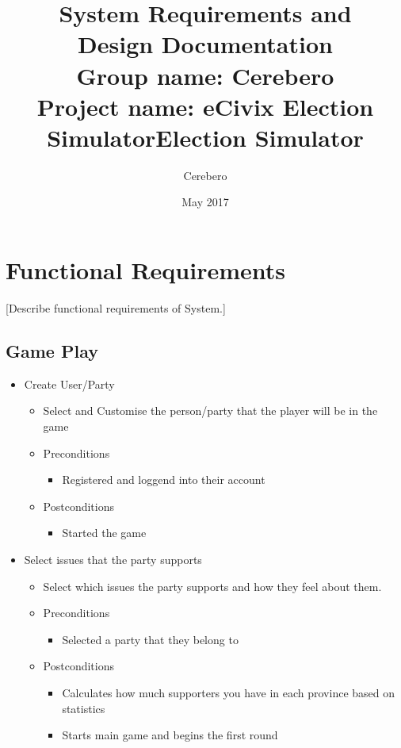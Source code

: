\documentclass{article}
\title{\textbf{System Requirements and \\Design Documentation}\\
        \textbf{Group name:} Cerebero\\
       \textbf{ Project name:} eCivix Election Simulator}
\date{May 2017}
\author{Cerebero}
\title{Election Simulator}
\begin{document}
  
  \tableofcontents
  \newpage

  \section{Functional Requirements}
  [Describe functional requirements of System.]
   \subsection{Game Play}
   	\begin{itemize}
   		\item Create User/Party
			\begin{itemize}
				\item Select and Customise the person/party that the player will be in the game
				\item Preconditions
				\begin{itemize}
					\item Registered and loggend into their account
				\end{itemize}
				\item Postconditions
				\begin{itemize}
					\item Started the game
				\end{itemize}
			\end{itemize}
	\end{itemize}
	
	\begin{itemize}
   		\item Select issues that the party supports
			\begin{itemize}
				\item Select which issues the party supports and how they feel about them.
				\item Preconditions
				\begin{itemize}
					\item Selected a party that they belong to
				\end{itemize}
				\item Postconditions
				\begin{itemize}
					\item Calculates how much supporters you have in each province based on statistics
					\item Starts main game and begins the first round
				\end{itemize}
			\end{itemize}
	\end{itemize}
	
\end{document}

